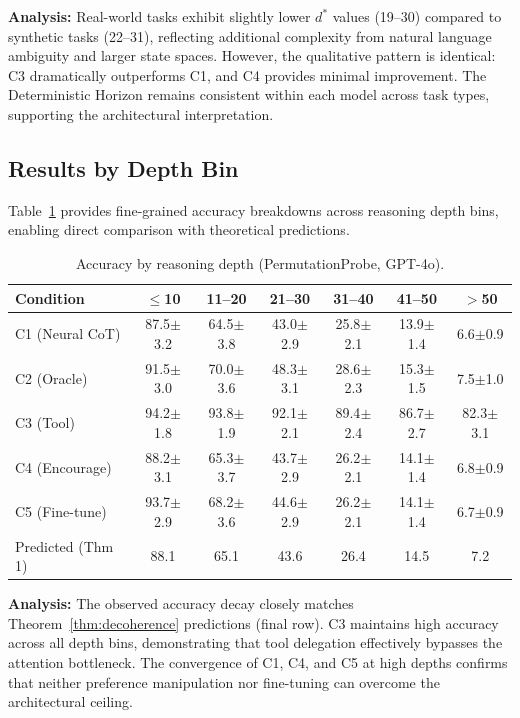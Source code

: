 \documentclass{article}
\theoremstyle{plain}
\theoremstyle{definition}
\theoremstyle{remark}
\begin{document}
\textbf{Analysis:} Real-world tasks exhibit slightly lower $d^*$ values (19--30) compared to synthetic tasks (22--31), reflecting additional complexity from natural language ambiguity and larger state spaces. However, the qualitative pattern is identical: C3 dramatically outperforms C1, and C4 provides minimal improvement. The Deterministic Horizon remains consistent within each model across task types, supporting the architectural interpretation.

\subsection{Results by Depth Bin}

Table~\ref{tab:results_by_depth} provides fine-grained accuracy breakdowns across reasoning depth bins, enabling direct comparison with theoretical predictions.

\begin{table}[h]
\centering
\caption{Accuracy by reasoning depth (PermutationProbe, GPT-4o).}
\label{tab:results_by_depth}
\small
\begin{tabular}{@{}lcccccc@{}}
\toprule
\textbf{Condition} & \textbf{$\leq$10} & \textbf{11--20} & \textbf{21--30} & \textbf{31--40} & \textbf{41--50} & \textbf{$>$50} \\
\midrule
C1 (Neural CoT) & 87.5$\pm$3.2 & 64.5$\pm$3.8 & 43.0$\pm$2.9 & 25.8$\pm$2.1 & 13.9$\pm$1.4 & 6.6$\pm$0.9 \\
C2 (Oracle) & 91.5$\pm$3.0 & 70.0$\pm$3.6 & 48.3$\pm$3.1 & 28.6$\pm$2.3 & 15.3$\pm$1.5 & 7.5$\pm$1.0 \\
C3 (Tool) & 94.2$\pm$1.8 & 93.8$\pm$1.9 & 92.1$\pm$2.1 & 89.4$\pm$2.4 & 86.7$\pm$2.7 & 82.3$\pm$3.1 \\
C4 (Encourage) & 88.2$\pm$3.1 & 65.3$\pm$3.7 & 43.7$\pm$2.9 & 26.2$\pm$2.1 & 14.1$\pm$1.4 & 6.8$\pm$0.9 \\
C5 (Fine-tune) & 93.7$\pm$2.9 & 68.2$\pm$3.6 & 44.6$\pm$2.9 & 26.2$\pm$2.1 & 14.1$\pm$1.4 & 6.7$\pm$0.9 \\
\midrule
Predicted (Thm 1) & 88.1 & 65.1 & 43.6 & 26.4 & 14.5 & 7.2 \\
\bottomrule
\end{tabular}
\end{table}

\textbf{Analysis:} The observed accuracy decay closely matches Theorem~\ref{thm:decoherence} predictions (final row). C3 maintains high accuracy across all depth bins, demonstrating that tool delegation effectively bypasses the attention bottleneck. The convergence of C1, C4, and C5 at high depths confirms that neither preference manipulation nor fine-tuning can overcome the architectural ceiling.
\end{document}
